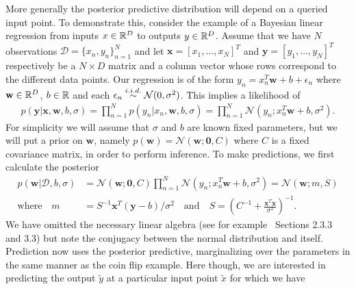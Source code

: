 More generally the posterior predictive distribution will depend on a queried input point.
To demonstrate this, consider the example of a Bayesian linear regression from inputs $x\in\mathbb{R}^D$
to outputs $y\in\mathbb{R}^D$.  Assume that we have $N$ observations $\mathcal{D} = \{x_n,y_n\}_{n=1}^N$
and let $\mathbf{x}=[x_1,\dots,x_N]^T$ and $\mathbf{y}=[y_1,\dots,y_N]^T$ respectively be 
a $N\times D$ matrix and a column vector whose rows correspond to the different data points.
Our regression is of the form $y_n= x_n^T\mathbf{w}+b+\epsilon_n$ where $\mathbf{w}\in\mathbb{R}^D$, $b\in\mathbb{R}$
and each $\epsilon_n \overset{i.i.d.}{\sim} \mathcal{N}(0,\sigma^2)$.  This implies a likelihood of
\begin{align}
\label{eq:bayes:linear-reg-lik}
p(\mathbf{y}|\mathbf{x},\mathbf{w},b,\sigma) = \prod_{n=1}^{N} p(y_n | x_n, \mathbf{w}, b, \sigma) = 
\prod_{n=1}^{N} \mathcal{N}(y_n;x_n^T\mathbf{w}+b,\sigma^2).
\end{align}
For simplicity we will assume that $\sigma$ and $b$ are known fixed parameters,
but we will put a prior on $\mathbf{w}$, namely $p(\mathbf{w}) = \mathcal{N}(\mathbf{w};\mathbf{0},C)$
where $C$ is a fixed covariance matrix, in order to perform inference.
To make predictions, we first calculate the posterior
\begin{align}
p(\mathbf{w}| \mathcal{D}, b,\sigma) &= \mathcal{N}(\mathbf{w};\mathbf{0},C)
\prod_{n=1}^{N} \mathcal{N}(y_n;x_n^T \mathbf{w}+b,\sigma^2) = \mathcal{N}\left(\mathbf{w} ; m, S\right) \\
\mathrm{where} \quad m &= S^{-1} \mathbf{x}^T \left(\mathbf{y}-b\right)/\sigma^2 \quad
\mathrm{and} \quad S = \left( C^{-1}+\frac{\mathbf{x}^T\mathbf{x}}{\sigma^2}\right)^{-1}. \nonumber
\end{align}
We have omitted the necessary linear algebra (see for example~\cite{bishop2006pattern}
Sections 2.3.3 and 3.3)
but note the conjugacy between
the normal distribution and itself.  Prediction now uses the posterior predictive, marginalizing
over the parameters in the same manner as the coin flip example.  Here though, we are interested
in predicting the output $\tilde{y}$ at a particular input point $\tilde{x}$ for which we have
